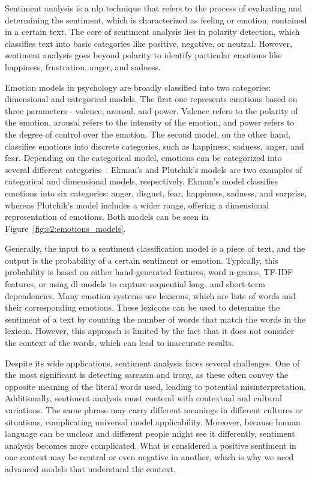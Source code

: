 Sentiment analysis is a \ac{nlp} technique that refers to the process of evaluating and determining the sentiment, which is characterized as feeling or emotion, contained in a certain text.
The core of sentiment analysis lies in polarity detection, which classifies text into basic categories like positive, negative, or neutral. However, sentiment analysis goes beyond polarity to identify particular emotions like happiness, frustration, anger, and sadness. 

Emotion models in psychology are broadly classified into two categories: dimensional and categorical models. The first one represents emotions based on three parameters - valence, arousal, and power. Valence refers to the polarity of the emotion, arousal refers to the intensity of the emotion, and power refers to the degree of control over the emotion. The second model, on the other hand, classifies emotions into discrete categories, such as happiness, sadness, anger, and fear. Depending on the categorical model, emotions can be categorized into several different categories~\cite{nandwani2021review}. Ekman's and Plutchik's models are two examples of categorical and dimensional models, respectively. Ekman's model classifies emotions into six categories: anger, disgust, fear, happiness, sadness, and surprise, whereas Plutchik's model includes a wider range, offering a dimensional representation of emotions. Both models can be seen in Figure~\ref{fig:c2:emotions_models}.



Generally, the input to a sentiment classification model is a piece of text, and the output is the probability of a certain sentiment or emotion. Typically, this probability is based on either hand-generated features, word n-grams, TF-IDF features, or using \ac{dl} models to capture sequential long- and short-term dependencies. Many emotion systems use lexicons, which are lists of words and their corresponding emotions. These lexicons can be used to determine the sentiment of a text by counting the number of words that match the words in the lexicon. However, this approach is limited by the fact that it does not consider the context of the words, which can lead to inaccurate results.

Despite its wide applications, sentiment analysis faces several challenges. One of the most significant is detecting sarcasm and irony, as these often convey the opposite meaning of the literal words used, leading to potential misinterpretation. Additionally, sentiment analysis must contend with contextual and cultural variations. The same phrase may carry different meanings in different cultures or situations, complicating universal model applicability. Moreover, because human language can be unclear and different people might see it differently, sentiment analysis becomes more complicated. What is considered a positive sentiment in one context may be neutral or even negative in another, which is why we need advanced models that understand the context.

